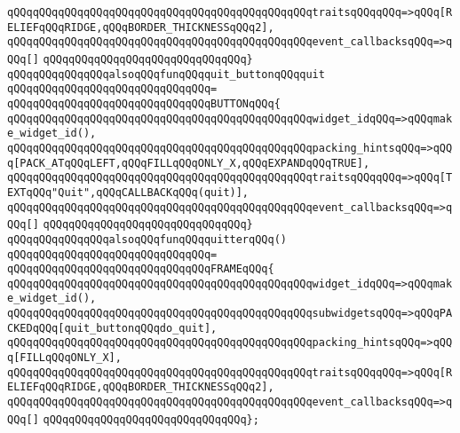 \verb|qQQqqQQqqQQqqQQqqQQqqQQqqQQqqQQqqQQqqQQqqQQqqQQqtraitsqQQqqQQq=>qQQq[RELIEFqQQqRIDGE,qQQqBORDER_THICKNESSqQQq2],|\newline
\verb|qQQqqQQqqQQqqQQqqQQqqQQqqQQqqQQqqQQqqQQqqQQqqQQqevent_callbacksqQQq=>qQQq[]|\newline
\verb|qQQqqQQqqQQqqQQqqQQqqQQqqQQqqQQq}|\newline
\newline
\newline
\verb|qQQqqQQqqQQqqQQqalsoqQQqfunqQQqquit_buttonqQQqquit|\newline
\verb|qQQqqQQqqQQqqQQqqQQqqQQqqQQqqQQq=|\newline
\verb|qQQqqQQqqQQqqQQqqQQqqQQqqQQqqQQqBUTTONqQQq{|\newline
\verb|qQQqqQQqqQQqqQQqqQQqqQQqqQQqqQQqqQQqqQQqqQQqqQQqwidget_idqQQq=>qQQqmake_widget_id(),|\newline
\verb|qQQqqQQqqQQqqQQqqQQqqQQqqQQqqQQqqQQqqQQqqQQqqQQqpacking_hintsqQQq=>qQQq[PACK_ATqQQqLEFT,qQQqFILLqQQqONLY_X,qQQqEXPANDqQQqTRUE],|\newline
\verb|qQQqqQQqqQQqqQQqqQQqqQQqqQQqqQQqqQQqqQQqqQQqqQQqtraitsqQQqqQQq=>qQQq[TEXTqQQq"Quit",qQQqCALLBACKqQQq(quit)],|\newline
\verb|qQQqqQQqqQQqqQQqqQQqqQQqqQQqqQQqqQQqqQQqqQQqqQQqevent_callbacksqQQq=>qQQq[]|\newline
\verb|qQQqqQQqqQQqqQQqqQQqqQQqqQQqqQQq}|\newline
\newline
\verb|qQQqqQQqqQQqqQQqalsoqQQqfunqQQqquitterqQQq()|\newline
\verb|qQQqqQQqqQQqqQQqqQQqqQQqqQQqqQQq=|\newline
\verb|qQQqqQQqqQQqqQQqqQQqqQQqqQQqqQQqFRAMEqQQq{|\newline
\verb|qQQqqQQqqQQqqQQqqQQqqQQqqQQqqQQqqQQqqQQqqQQqqQQqwidget_idqQQq=>qQQqmake_widget_id(),|\newline
\verb|qQQqqQQqqQQqqQQqqQQqqQQqqQQqqQQqqQQqqQQqqQQqqQQqsubwidgetsqQQq=>qQQqPACKEDqQQq[quit_buttonqQQqdo_quit],|\newline
\verb|qQQqqQQqqQQqqQQqqQQqqQQqqQQqqQQqqQQqqQQqqQQqqQQqpacking_hintsqQQq=>qQQq[FILLqQQqONLY_X],|\newline
\verb|qQQqqQQqqQQqqQQqqQQqqQQqqQQqqQQqqQQqqQQqqQQqqQQqtraitsqQQqqQQq=>qQQq[RELIEFqQQqRIDGE,qQQqBORDER_THICKNESSqQQq2],|\newline
\verb|qQQqqQQqqQQqqQQqqQQqqQQqqQQqqQQqqQQqqQQqqQQqqQQqevent_callbacksqQQq=>qQQq[]|\newline
\verb|qQQqqQQqqQQqqQQqqQQqqQQqqQQqqQQq};|\newline
